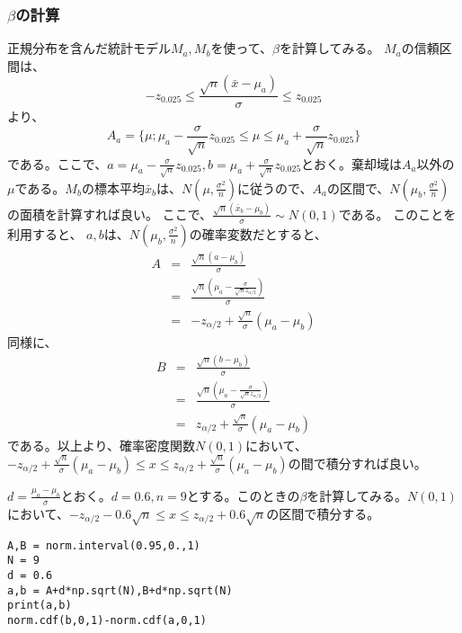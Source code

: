 \documentclass[a4paper,11pt,dvipdfmx]{jsarticle}
\begin{document}
\subsubsection{$\beta$の計算}
正規分布を含んだ統計モデル$M_a,M_b$を使って、$\beta$を計算してみる。
$M_a$の信頼区間は、
\begin{equation*}
    -z_{0.025}\leq \frac{\sqrt{n}(\bar{x}-\mu_a)}{\sigma}\leq z_{0.025}
\end{equation*}
より、
\begin{equation*}
    A_a = \{ \mu ; \mu_a -\frac{\sigma}{\sqrt{n}}z_{0.025} \leq \mu \leq \mu_a +\frac{\sigma}{\sqrt{n}}z_{0.025} \}
\end{equation*}
である。ここで、$a=\mu_a -\frac{\sigma}{\sqrt{n}}z_{0.025},b = \mu_a +\frac{\sigma}{\sqrt{n}}z_{0.025} $とおく。棄却域は$A_a$以外の$\mu$である。$M_b$の標本平均$\bar{x}_b$は、$N(\mu,\frac{\sigma^2}{n})$に従うので、$A_a$の区間で、$N(\mu_b,\frac{\sigma^2}{n})$の面積を計算すれば良い。
ここで、$\frac{\sqrt{n}(\bar{x}_b-\mu_b)}{\sigma}\sim N(0,1)$である。
このことを利用すると、
$a,b$は、$N(\mu_b,\frac{\sigma^2}{n})$の確率変数だとすると、
\begin{eqnarray*}
    A &=& \frac{\sqrt{n}(a-\mu_b)}{\sigma} \\
    &=& \frac{\sqrt{n}(\mu_a-\frac{\sigma}{\sqrt{n} z_{\alpha/2}})}{\sigma}\\
    &=& -z_{\alpha/2}+\frac{\sqrt{n}}{\sigma}(\mu_a-\mu_b)
\end{eqnarray*}
同様に、
\begin{eqnarray*}
    B &=& \frac{\sqrt{n}(b-\mu_b)}{\sigma} \\
    &=& \frac{\sqrt{n}(\mu_a-\frac{\sigma}{\sqrt{n} z_{\alpha/2}})}{\sigma}\\
    &=& z_{\alpha/2}+\frac{\sqrt{n}}{\sigma}(\mu_a-\mu_b)
\end{eqnarray*}
である。以上より、確率密度関数$N(0,1)$において、$-z_{\alpha/2}+\frac{\sqrt{n}}{\sigma}(\mu_a-\mu_b) \leq x\leq  z_{\alpha/2}+\frac{\sqrt{n}}{\sigma}(\mu_a-\mu_b)$の間で積分すれば良い。

$d=\frac{\mu_a-\mu_b}{\sigma}$とおく。$d=0.6,n=9$とする。このときの$\beta$を計算してみる。$N(0,1)$において、$-z_{\alpha/2} -0.6\sqrt{n} \leq x \leq z_{\alpha/2} +0.6\sqrt{n}$の区間で積分する。

\begin{lstlisting}
A,B = norm.interval(0.95,0.,1)
N = 9
d = 0.6
a,b = A+d*np.sqrt(N),B+d*np.sqrt(N)
print(a,b)
norm.cdf(b,0,1)-norm.cdf(a,0,1)
\end{lstlisting}
\end{document}
